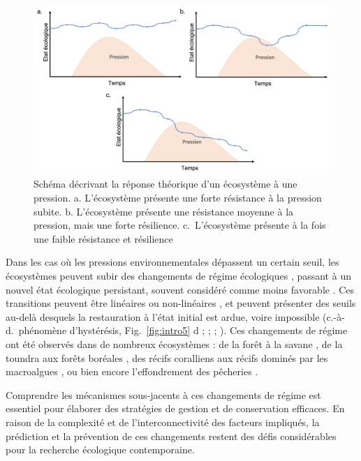 \begin{refsection}
\begin{figure}
\hypertarget{fig:intro6}{%
\centering
\includegraphics{02-Introduction/figures/resitance_resillience_schema.png}
\caption[Schéma décrivant la réponse théorique d'un écosystème à une
pression.]{Schéma décrivant la réponse théorique d'un écosystème à une
pression. a. L'écosystème présente une forte résistance à la pression
subite. b. L'écosystème présente une résistance moyenne à la pression,
mais une forte résilience. c.~L'écosystème présente à la fois une faible
résistance et résilience}\label{fig:intro6}
}
\end{figure}

Dans les cas où les pressions environnementales dépassent un certain
seuil, les écosystèmes peuvent subir des changements de régime
écologiques \autocite{Scheffer_2001}, passant à un nouvel état
écologique persistant, souvent considéré comme moins favorable
\autocites[ ]{Nystrom_2012}{Rocha_2015a}. Ces transitions peuvent être
linéaires ou non-linéaires \autocite{Scheffer_2015}, et peuvent
présenter des seuils au-delà desquels la restauration à l'état initial
est ardue, voire impossible (c.-à-d.~phénomène d'hystérésis,
Fig.~\ref{fig:intro5} d ; \textcite{Marzloff_2016} ;
\textcite{Johnson_2017} ; \textcite{Rocha_2018}). Ces changements de
régime ont été observés dans de nombreux écosystèmes : de la forêt à la
savane \autocite{Staver_2011}, de la toundra aux forêts boréales
\autocite{Scheffer_2012}, des récifs coralliens aux récifs dominés par
les macroalgues \autocite{McManus_2004}, ou bien encore l'effondrement
des pêcheries \autocite{Gardmark_2015}.

Comprendre les mécanismes sous-jacents à ces changements de régime est
essentiel pour élaborer des stratégies de gestion et de conservation
efficaces. En raison de la complexité et de l'interconnectivité des
facteurs impliqués, la prédiction et la prévention de ces changements
restent des défis considérables pour la recherche écologique
contemporaine.


\end{refsection}

